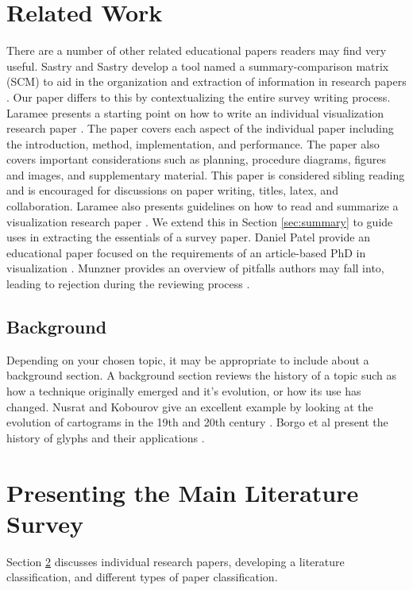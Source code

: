 \section{Related Work} \label{sec:related}
There are a number of other related educational papers readers may find very useful.
Sastry and Sastry develop a tool named a summary-comparison matrix (SCM) to aid in the organization and extraction of information in research papers \cite{sastry2013summary}. Our paper differs to this by contextualizing the entire survey writing process.
Laramee presents a starting point on how to write an individual visualization research paper \cite{laramee2010write}. The paper covers each aspect of the individual paper including the introduction, method, implementation, and performance. The paper also covers important considerations such as planning, procedure diagrams, figures and images, and supplementary material. This paper is considered sibling reading and is encouraged for discussions on paper writing, titles, latex, and collaboration. Laramee also presents guidelines on how to read and summarize a visualization research paper \cite{laramee2011read}. We extend this in Section \ref{sec:summary} to guide uses in extracting the essentials of a survey paper. Daniel Patel provide an educational paper focused on the requirements of an article-based PhD in visualization \cite{patel2011phd}. Munzner provides an overview of pitfalls authors may fall into, leading to rejection during the reviewing process \cite{munzner2008process}.


\subsection{Background}
Depending on your chosen topic, it may be appropriate to include about a background section. A background section reviews the history of a topic such as how a technique originally emerged and it's evolution, or how its use has changed.  Nusrat and Kobourov give an excellent example by looking at the evolution of cartograms in the 19th and 20th century \cite{nusrat2016state}. Borgo et al present the history of glyphs and their applications \cite{borgo2013glyph}.

\section{Presenting the Main Literature Survey}\label{sec:presenting}
Section \ref{sec:presenting} discusses individual research papers, developing a literature classification, and different types of paper classification.
